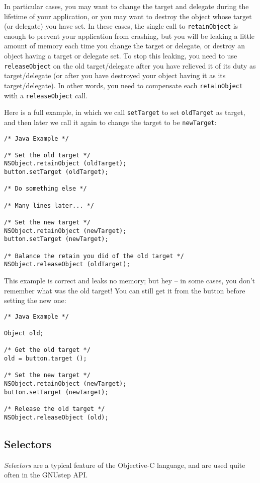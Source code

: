 In particular cases, you may want to change the target and delegate
during the lifetime of your application, or you may want to destroy
the object whose target (or delegate) you have set.  In these cases,
the single call to \texttt{retainObject} is enough to prevent your
application from crashing, but you will be leaking a little amount of
memory each time you change the target or delegate, or destroy an
object having a target or delegate set.  To stop this leaking, you
need to use \texttt{releaseObject} on the old target/delegate after
you have relieved it of its duty as target/delegate (or after you have
destroyed your object having it as its target/delegate).  In other 
words, you need to compensate each \texttt{retainObject} with a 
\texttt{releaseObject} call.

Here is a full example, in which we call \texttt{setTarget} to set
\texttt{oldTarget} as target, and then later we call it again to
change the target to be \texttt{newTarget}:
\begin{verbatim}
/* Java Example */

/* Set the old target */
NSObject.retainObject (oldTarget);
button.setTarget (oldTarget);

/* Do something else */

/* Many lines later... */

/* Set the new target */
NSObject.retainObject (newTarget);
button.setTarget (newTarget);

/* Balance the retain you did of the old target */
NSObject.releaseObject (oldTarget);
\end{verbatim}
This example is correct and leaks no memory; but hey -- in some cases,
you don't remember what was the old target!  You can still get it from
the button before setting the new one:
\begin{verbatim}
/* Java Example */

Object old;

/* Get the old target */
old = button.target ();

/* Set the new target */
NSObject.retainObject (newTarget);
button.setTarget (newTarget);

/* Release the old target */
NSObject.releaseObject (old);
\end{verbatim}

\subsection{Selectors}

{\sl Selectors} are a typical feature of the Objective-C language, and
are used quite often in the GNUstep API.  

